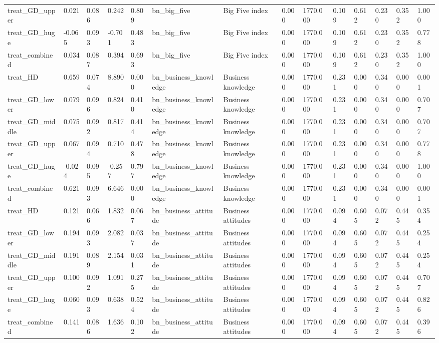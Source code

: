 \begin{tabular}{llllllllllllll}
treat\_GD\_upper & 0.021 & 0.086 & 0.242 & 0.809 & bn\_big\_five & Big Five index & 0.000 & 1770.000 & 0.109 & 0.612 & 0.230 & 0.352 & 1.000 \\
treat\_GD\_huge & -0.065 & 0.093 & -0.701 & 0.483 & bn\_big\_five & Big Five index & 0.000 & 1770.000 & 0.109 & 0.612 & 0.230 & 0.352 & 0.778 \\
treat\_combined & 0.034 & 0.087 & 0.394 & 0.693 & bn\_big\_five & Big Five index & 0.000 & 1770.000 & 0.109 & 0.612 & 0.230 & 0.352 & 1.000 \\
treat\_HD & 0.659 & 0.074 & 8.890 & 0.000 & bn\_business\_knowledge & Business knowledge & 0.000 & 1770.000 & 0.231 & 0.000 & 0.340 & 0.000 & 0.001 \\
treat\_GD\_lower & 0.079 & 0.096 & 0.824 & 0.410 & bn\_business\_knowledge & Business knowledge & 0.000 & 1770.000 & 0.231 & 0.000 & 0.340 & 0.000 & 0.707 \\
treat\_GD\_middle & 0.075 & 0.092 & 0.817 & 0.414 & bn\_business\_knowledge & Business knowledge & 0.000 & 1770.000 & 0.231 & 0.000 & 0.340 & 0.000 & 0.707 \\
treat\_GD\_upper & 0.067 & 0.094 & 0.710 & 0.478 & bn\_business\_knowledge & Business knowledge & 0.000 & 1770.000 & 0.231 & 0.000 & 0.340 & 0.000 & 0.778 \\
treat\_GD\_huge & -0.024 & 0.095 & -0.257 & 0.797 & bn\_business\_knowledge & Business knowledge & 0.000 & 1770.000 & 0.231 & 0.000 & 0.340 & 0.000 & 1.000 \\
treat\_combined & 0.621 & 0.093 & 6.646 & 0.000 & bn\_business\_knowledge & Business knowledge & 0.000 & 1770.000 & 0.231 & 0.000 & 0.340 & 0.000 & 0.001 \\
treat\_HD & 0.121 & 0.066 & 1.832 & 0.067 & bn\_business\_attitude & Business attitudes & 0.000 & 1770.000 & 0.094 & 0.605 & 0.072 & 0.445 & 0.354 \\
treat\_GD\_lower & 0.194 & 0.093 & 2.082 & 0.037 & bn\_business\_attitude & Business attitudes & 0.000 & 1770.000 & 0.094 & 0.605 & 0.072 & 0.445 & 0.254 \\
treat\_GD\_middle & 0.191 & 0.089 & 2.154 & 0.031 & bn\_business\_attitude & Business attitudes & 0.000 & 1770.000 & 0.094 & 0.605 & 0.072 & 0.445 & 0.254 \\
treat\_GD\_upper & 0.100 & 0.092 & 1.091 & 0.275 & bn\_business\_attitude & Business attitudes & 0.000 & 1770.000 & 0.094 & 0.605 & 0.072 & 0.445 & 0.707 \\
treat\_GD\_huge & 0.060 & 0.093 & 0.638 & 0.524 & bn\_business\_attitude & Business attitudes & 0.000 & 1770.000 & 0.094 & 0.605 & 0.072 & 0.445 & 0.826 \\
treat\_combined & 0.141 & 0.086 & 1.636 & 0.102 & bn\_business\_attitude & Business attitudes & 0.000 & 1770.000 & 0.094 & 0.605 & 0.072 & 0.445 & 0.396 \\
\bottomrule
\end{tabular}
